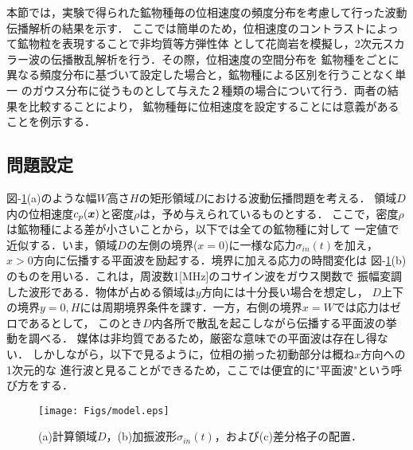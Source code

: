 本節では，実験で得られた鉱物種毎の位相速度の頻度分布を考慮して行った波動伝播解析の結果を示す．
ここでは簡単のため，位相速度のコントラストによって鉱物粒を表現することで非均質等方弾性体
として花崗岩を模擬し，2次元スカラー波の伝播散乱解析を行う．その際，位相速度の空間分布を
鉱物種をごとに異なる頻度分布に基づいて設定した場合と，鉱物種による区別を行うことなく単一
のガウス分布に従うものとして与えた２種類の場合について行う．両者の結果を比較することにより，
鉱物種毎に位相速度を設定することには意義があることを例示する．
\subsection{問題設定}
図-\ref{fig:fig15}(a)のような幅$W$高さ$H$の矩形領域$D$における波動伝播問題を考える．
領域$D$内の位相速度$c_p(\mbox{\boldmath{$x$}})$と密度$\rho$は，予め与えられているものとする．
ここで，密度$\rho$は鉱物種による差が小さいことから，以下では全ての鉱物種に対して
一定値で近似する．いま，領域$D$の左側の境界($x=0$)に一様な応力$\sigma_{in}(t)$を加え，
$x>0$方向に伝播する平面波を励起する．境界に加える応力の時間変化は
図-\ref{fig:fig15}(b)のものを用いる．これは，周波数1[MHz]のコサイン波をガウス関数で
振幅変調した波形である．物体が占める領域は$y$方向には十分長い場合を想定し，
$D$上下の境界$y=0,H$には周期境界条件を課す．一方，右側の境界$x=W$では応力はゼロであるとして，
このとき$D$内各所で散乱を起こしながら伝播する平面波の挙動を調べる．
媒体は非均質であるため，厳密な意味での平面波は存在し得ない．
しかしながら，以下で見るように，位相の揃った初動部分は概ね$x$方向への1次元的な
進行波と見ることができるため，ここでは便宜的に"平面波"という呼び方をする．
\begin{figure}
\begin{center}
	\texttt{[image: Figs/model.eps]}
	\caption{(a)計算領域$D$，(b)加振波形$\sigma_{in}(t)$，および(c)差分格子の配置．}
	\label{fig:fig15}
\end{center}
\end{figure}
